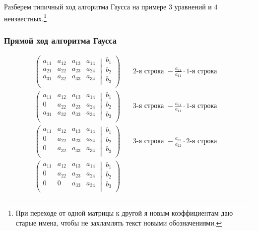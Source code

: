 \documentclass{article}
\begin{document}
Разберем типичный ход алгоритма Гаусса на примере $3$ уравнений и $4$ неизвестных.\footnote{При переходе от одной матрицы к другой я новым коэффициентам даю старые имена, чтобы не захламлять текст новыми обозначениями.}
\subsubsection*{Прямой ход алгоритма Гаусса}
\begin{align*}
	\left(\left.
	\begin{matrix}
		a_{11}& a_{12}&a_{13}& a_{14}\\
		a_{21}& a_{22}&a_{23}& a_{24}\\
		a_{31}& a_{32}&a_{33}& a_{34}\\
	\end{matrix}
	\:\right|\:
	\begin{matrix}
		b_1\\
		b_2\\
		b_3\\
	\end{matrix}
	\right)&
	\quad 2\text{-я строка }-\frac{a_{21}}{a_{11}}\cdot1\text{-я строка}\quad\\
	\left(\left.
	\begin{matrix}
		a_{11}& a_{12}&a_{13}& a_{14}\\
		0& a_{22}&a_{23}& a_{24}\\
		a_{31}& a_{32}&a_{33}& a_{34}\\
	\end{matrix}
	\:\right|\:
	\begin{matrix}
		b_1\\
		b_2\\
		b_3\\
	\end{matrix}
	\right)&
	\quad 3\text{-я строка }-\frac{a_{31}}{a_{11}}\cdot1\text{-я строка}\quad\\
	\left(\left.
	\begin{matrix}
		a_{11}& a_{12}&a_{13}& a_{14}\\
		0& a_{22}&a_{23}& a_{24}\\
		0& a_{32}&a_{33}& a_{34}\\
	\end{matrix}
	\:\right|\:
	\begin{matrix}
		b_1\\
		b_2\\
		b_3\\
	\end{matrix}
	\right)&
	\quad 3\text{-я строка }-\frac{a_{32}}{a_{22}}\cdot2\text{-я строка}\quad\\
	\left(\left.
	\begin{matrix}
		a_{11}& a_{12}&a_{13}& a_{14}\\
		0& a_{22}&a_{23}& a_{24}\\
		0& 0&a_{33}& a_{34}\\
	\end{matrix}
	\:\right|\:
	\begin{matrix}
		b_1\\
		b_2\\
		b_3\\
	\end{matrix}
	\right)&
\end{align*}
\end{document}

